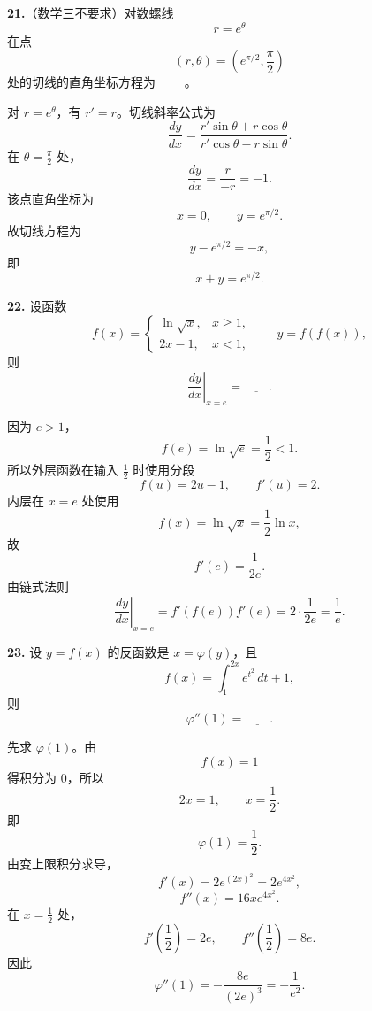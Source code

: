\begin{problemblock}
\textbf{21.}（数学三不要求）对数螺线
\[
r=e^\theta
\]
在点
\[
(r,\theta)=\left(e^{\pi/2},\frac\pi2\right)
\]
处的切线的直角坐标方程为 \(\underline{\qquad}\)。
\end{problemblock}

\begin{solutionblock}
对 \(r=e^\theta\)，有 \(r'=r\)。切线斜率公式为
\[
\frac{dy}{dx}
=\frac{r'\sin\theta+r\cos\theta}{r'\cos\theta-r\sin\theta}.
\]
在 \(\theta=\frac\pi2\) 处，
\[
\frac{dy}{dx}
=\frac{r}{-r}=-1.
\]
该点直角坐标为
\[
x=0,\qquad y=e^{\pi/2}.
\]
故切线方程为
\[
y-e^{\pi/2}=-x,
\]
即
\[
x+y=e^{\pi/2}.
\]
\end{solutionblock}

\begin{problemblock}
\textbf{22.} 设函数
\[
f(x)=
\begin{cases}
\ln\sqrt{x},&x\ge1,\\
2x-1,&x<1,
\end{cases}
\qquad y=f(f(x)),
\]
则
\[
\left.\frac{dy}{dx}\right|_{x=e}
=\underline{\qquad}.
\]
\end{problemblock}

\begin{solutionblock}
因为 \(e>1\)，
\[
f(e)=\ln\sqrt e=\frac12<1.
\]
所以外层函数在输入 \(\frac12\) 时使用分段
\[
f(u)=2u-1,\qquad f'(u)=2.
\]
内层在 \(x=e\) 处使用
\[
f(x)=\ln\sqrt{x}=\frac12\ln x,
\]
故
\[
f'(e)=\frac1{2e}.
\]
由链式法则
\[
\left.\frac{dy}{dx}\right|_{x=e}
=f'(f(e))f'(e)=2\cdot\frac1{2e}=\frac1e.
\]
\end{solutionblock}

\begin{problemblock}
\textbf{23.} 设 \(y=f(x)\) 的反函数是 \(x=\varphi(y)\)，且
\[
f(x)=\int_1^{2x}e^{t^2}\,dt+1,
\]
则
\[
\varphi''(1)=\underline{\qquad}.
\]
\end{problemblock}

\begin{solutionblock}
先求 \(\varphi(1)\)。由
\[
f(x)=1
\]
得积分为 0，所以
\[
2x=1,\qquad x=\frac12.
\]
即
\[
\varphi(1)=\frac12.
\]
由变上限积分求导，
\[
f'(x)=2e^{(2x)^2}=2e^{4x^2},
\]
\[
f''(x)=16xe^{4x^2}.
\]
在 \(x=\frac12\) 处，
\[
f'\left(\frac12\right)=2e,\qquad
f''\left(\frac12\right)=8e.
\]
因此
\[
\varphi''(1)=
-\frac{8e}{(2e)^3}
=-\frac1{e^2}.
\]
\end{solutionblock}

